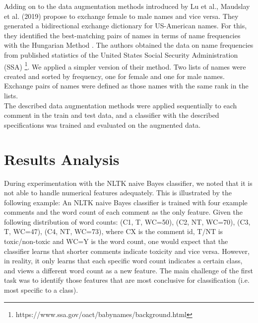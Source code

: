 \documentclass[11pt,a4paper]{article}
\begin{document}
Adding on to the data augmentation methods introduced by Lu et al., Maudslay et al. (2019) propose to exchange female to male names and vice versa. They generated a bidirectional exchange dictionary for US-American names. For this, they identified the best-matching pairs of names in terms of name frequencies with the Hungarian Method \cite{hungarianmethod}. The authors obtained the data on name frequencies from published statistics of the United States Social Security Administration (SSA) \footnote{https://www.ssa.gov/oact/babynames/background.html}. We applied a simpler version of their method. Two lists of names were created and sorted by frequency, one for female and one for male names. Exchange pairs of names were defined as those names with the same rank in the lists. \\
The described data augmentation methods were applied sequentially to each comment in the train and test data, and a classifier with the described specifications was trained and evaluated on the augmented data. \\

\section{Results Analysis}
During experimentation with the NLTK naive Bayes classifier, we noted that it is not able to handle numerical features adequately. This is illustrated by the following example: An NLTK naive Bayes classifier is trained with four example comments and the word count of each comment as the only feature. Given the following distribution of word counts: (C1, T, WC=50), (C2, NT, WC=70), (C3, T, WC=47), (C4, NT, WC=73), where CX is the comment id, T/NT is toxic/non-toxic and WC=Y is the word count, one would expect that the classifier learns that shorter comments indicate toxicity and vice versa. However, in reality, it only learns that each specific word count indicates a certain class, and views a different word count as a new feature. The main challenge of the first task was to identify those features that are most conclusive for classification (i.e. most specific to a class). \\



\end{document}
